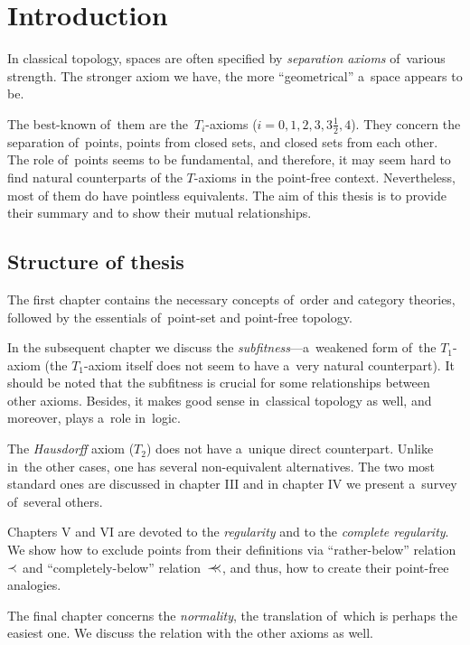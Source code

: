 \chapter*{Introduction}

In classical topology, spaces are often specified by \emph{separation axioms\/}
of~various strength.
The stronger axiom we have, the more ``geometrical'' a~space appears to be.

The best-known of~them are the~$T_i$-axioms ($i = 0, 1, 2, 3, 3\frac{1}{2},
4$).
They concern the separation of~points, points from closed sets, and closed sets
from each other.
The role of~points seems to be fundamental, and therefore, it may seem hard to
find natural counterparts of the $T$-axioms in the point-free context.
Nevertheless, most of them do have pointless equivalents.
The aim of this thesis is to provide their summary and to show their mutual
relationships.

\section*{Structure of thesis}

The first chapter contains the necessary concepts of~order and category
theories, followed by the essentials of~point-set and point-free topology.

In the subsequent chapter we discuss the \emph{subfitness\/}---a~weakened form
of~the $T_1$-axiom (the $T_1$-axiom itself does not seem to have a~very natural
counterpart).
It should be noted that the subfitness is crucial for some relationships
between other axioms.
Besides, it makes good sense in~classical topology as well, and moreover, plays
a~role in~logic.

The \emph{Hausdorff\/} axiom ($T_2$) does not have a~unique direct counterpart.
Unlike in~the other cases, one has several non-equivalent alternatives.
The two most standard ones are discussed in chapter III and in chapter IV we
present a~survey of~several others.

Chapters V and VI are devoted to the \emph{regularity\/} and to the
\emph{complete regularity\/}.
We show how to exclude points from their definitions via ``rather-below''
relation~$\prec$ and ``completely-below'' relation~$\prec\mkern-8mu\prec$, and thus, how to create
their point-free analogies.

The final chapter concerns the \emph{normality\/}, the translation of~which is
perhaps the easiest one.
We discuss the relation with the other axioms as well.
